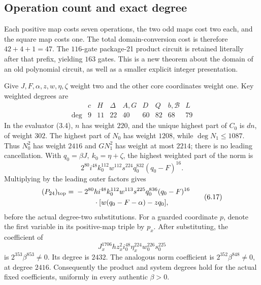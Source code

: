 \subsection{Operation count and exact degree}

Each positive map costs seven operations, the two odd maps cost two
each, and the square map costs one. The total domain-conversion
cost is therefore \(42+4+1=47\).
The \(116\)-gate package-21 product circuit is retained literally
after that prefix, yielding \(163\) gates.
This is a new theorem about the domain of an old polynomial
circuit, as well as a smaller explicit integer presentation.

Give \(J,F,\alpha,z,w,\eta,\zeta\) weight two and the other
core coordinates weight one. Key weighted degrees are
\[
\begin{array}{c|rrrrrrrr}
 &c&H&\Delta&A,G&D&Q&b,\mathcal B&L\\ \hline
\deg&9&11&22&40&60&82&68&79
\end{array}
\]
In the evaluator (3.4), \(n\) has weight \(220\), and the unique
highest part of \(C_0\) is \(dn\), of weight \(302\).
The highest part of \(N_0\) has weight \(1208\), while
\(\deg N_1\le1087\).
Thus \(N_0^2\) has weight \(2416\) and
\(GN_1^2\) has weight at most \(2214\); there is no leading
cancellation. With \(q_0=\beta J,\ k_0=\eta+\zeta\), the
highest weighted part of the norm is
\[
2^{80}i^{48}k_0^{112}w^{112}s^{224}q_0^{832}(q_0-F)^{16}.
\tag{6.16}
\]
Multiplying by the leading outer factors gives
\[
\begin{split}
(P_{24})_{\rm top}={}&-2^{80}h i^{48}k_0^{112}w^{113}s^{225}
 q_0^{836}(q_0-F)^{16}\\
&\hspace{9mm}\cdot[w(q_0-F-\alpha)-zq_0],
\end{split}
\tag{6.17}
\]
before the actual degree-two substitutions.
For a guarded coordinate \(p\), denote the first variable in its
positive-map triple by \(p_x\).
After substituting, the coefficient of
\[
J_x^{1706}h z_x^2 i_0^{48}\eta_x^{224}w_0^{226}s_0^{225}
\]
is \(2^{353}\beta^{853}\ne0\).
Its degree is \(2432\).
The analogous norm coefficient is
\(2^{352}\beta^{848}\ne0\), at degree \(2416\).
Consequently the product and system degrees hold for the actual
fixed coefficients, uniformly in every authentic \(\beta>0\).
